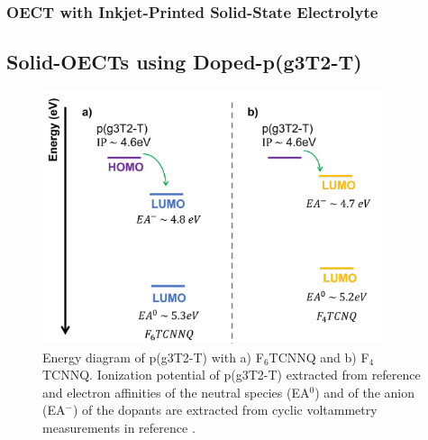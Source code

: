 \subsubsection{OECT with Inkjet-Printed Solid-State Electrolyte}


\subsection{Solid-OECTs using Doped-p(g3T2-T)}

\begin{figure}
  \centering
  \includegraphics[width=10cm]{Images/pdf/dopingprocess.pdf}
  \caption[Energy diagram of p(g3T2-T) and dopants F$_{6}$TCNNQ and F$_{4}$TCNNQ]{Energy diagram of p(g3T2-T) with a) F$_{6}$TCNNQ and b) F$_{4}$TCNNQ. Ionization potential of p(g3T2-T) extracted from reference \cite{tanTuningOrganicElectrochemical2022} and electron affinities of the neutral species (EA$^{0}$) and of the anion (EA$^{-}$) of the dopants are extracted from cyclic voltammetry measurements in reference \cite{kieferDoubleDopingConjugated2019}.}
  \label{fig:doping}
\end{figure}



